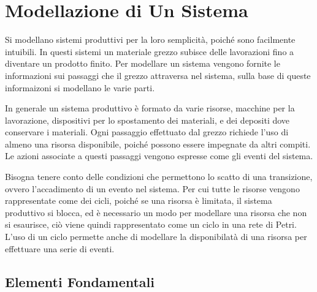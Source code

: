 \documentclass{article}
\numberwithin{equation}{subsection}
\begin{document}
\clearpage

\section{Modellazione di Un Sistema}

Si modellano sistemi produttivi per la loro semplicità, poiché sono facilmente intuibili. In questi sistemi un materiale grezzo subisce delle lavorazioni fino a diventare un 
prodotto finito. Per modellare un sistema vengono fornite le informazioni sui passaggi che il grezzo attraversa nel sistema, sulla base di queste informaizoni si 
modellano le varie parti. 

In generale un sistema produttivo è formato da varie risorse, macchine per la lavorazione, dispositivi per lo spostamento dei materiali, e dei depositi dove conservare 
i materiali. Ogni passaggio effettuato dal grezzo richiede l'uso di almeno una risorsa disponibile, poiché possono essere impegnate da altri compiti. Le azioni associate a 
questi passaggi vengono espresse come gli eventi del sistema. 


Bisogna tenere conto delle condizioni che permettono lo scatto di una transizione, ovvero l'accadimento di un evento nel sistema. 
Per cui tutte le risorse vengono rappresentate come dei cicli, poiché se una risorsa è limitata, il sistema produttivo si blocca, ed è necessario un modo per modellare una 
risorsa che non si esaurisce, ciò viene quindi rappresentato come un ciclo in una rete di Petri. L'uso di un ciclo permette anche di modellare la disponibilatà di una 
risorsa per effettuare una serie di eventi.  

\subsection{Elementi Fondamentali}
\end{document}

